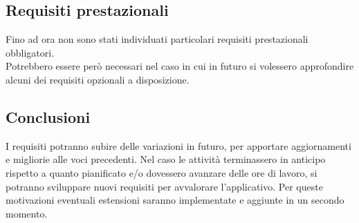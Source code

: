 \subsection{Requisiti prestazionali}
Fino ad ora non sono stati individuati particolari requisiti prestazionali obbligatori.\\
Potrebbero essere però necessari nel caso in cui in futuro si volessero approfondire alcuni dei requisiti opzionali a disposizione.


\subsection{Conclusioni}
I requisiti potranno subire delle variazioni in futuro, per apportare aggiornamenti e migliorie alle voci precedenti.
Nel caso le attività terminassero in anticipo rispetto a quanto pianificato e/o dovessero avanzare delle ore di lavoro, si potranno sviluppare nuovi
requisiti per avvalorare l'applicativo. Per queste motivazioni eventuali estensioni saranno implementate e aggiunte in un secondo momento.
